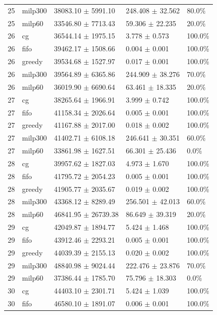 \begin{tabular}{rllll}
25 & milp300 & 38083.10 $\pm$ 5991.10 & 248.408 $\pm$ 32.562 & 80.0\% \\
25 & milp60 & 33546.80 $\pm$ 7713.43 & 59.306 $\pm$ 22.235 & 20.0\% \\
26 & cg & 36544.14 $\pm$ 1975.15 & 3.778 $\pm$ 0.573 & 100.0\% \\
26 & fifo & 39462.17 $\pm$ 1508.66 & 0.004 $\pm$ 0.001 & 100.0\% \\
26 & greedy & 39534.68 $\pm$ 1527.97 & 0.017 $\pm$ 0.001 & 100.0\% \\
26 & milp300 & 39564.89 $\pm$ 6365.86 & 244.909 $\pm$ 38.276 & 70.0\% \\
26 & milp60 & 36019.90 $\pm$ 6690.64 & 63.461 $\pm$ 18.335 & 20.0\% \\
27 & cg & 38265.64 $\pm$ 1966.91 & 3.999 $\pm$ 0.742 & 100.0\% \\
27 & fifo & 41158.34 $\pm$ 2026.64 & 0.005 $\pm$ 0.001 & 100.0\% \\
27 & greedy & 41167.88 $\pm$ 2017.00 & 0.018 $\pm$ 0.002 & 100.0\% \\
27 & milp300 & 41402.71 $\pm$ 6108.18 & 246.641 $\pm$ 30.351 & 60.0\% \\
27 & milp60 & 33861.98 $\pm$ 1627.51 & 66.301 $\pm$ 25.436 & 0.0\% \\
28 & cg & 39957.62 $\pm$ 1827.03 & 4.973 $\pm$ 1.670 & 100.0\% \\
28 & fifo & 41795.72 $\pm$ 2054.23 & 0.005 $\pm$ 0.001 & 100.0\% \\
28 & greedy & 41905.77 $\pm$ 2035.67 & 0.019 $\pm$ 0.002 & 100.0\% \\
28 & milp300 & 43368.12 $\pm$ 8289.49 & 256.501 $\pm$ 42.013 & 60.0\% \\
28 & milp60 & 46841.95 $\pm$ 26739.38 & 86.649 $\pm$ 39.319 & 20.0\% \\
29 & cg & 42049.87 $\pm$ 1894.77 & 5.424 $\pm$ 1.468 & 100.0\% \\
29 & fifo & 43912.46 $\pm$ 2293.21 & 0.005 $\pm$ 0.001 & 100.0\% \\
29 & greedy & 44039.39 $\pm$ 2155.13 & 0.020 $\pm$ 0.002 & 100.0\% \\
29 & milp300 & 48840.98 $\pm$ 9024.44 & 222.476 $\pm$ 23.876 & 70.0\% \\
29 & milp60 & 37386.44 $\pm$ 1785.70 & 75.796 $\pm$ 18.303 & 0.0\% \\
30 & cg & 44403.10 $\pm$ 2301.71 & 5.424 $\pm$ 1.039 & 100.0\% \\
30 & fifo & 46580.10 $\pm$ 1891.07 & 0.006 $\pm$ 0.001 & 100.0\% \\

\end{tabular}
